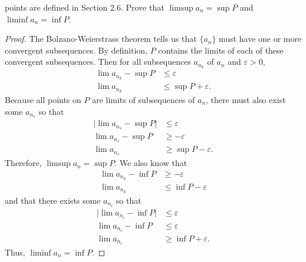 \documentclass{article}
\begin{document}
\begin{enumerate}
            points are defined in Section 2.6. Prove that
            $\limsup a_n=\sup P$ and $\liminf a_n=\inf P$.
            \begin{proof}
                  The Bolzano-Weierstrass theorem tells us that $\{a_n\}$ must
                  have one or more convergent subsequences. By definition, $P$
                  contains the limits of each of these convergent subsequences.
                  Then for all subsequences $a_{n_k}$ of $a_n$ and $\varepsilon>0$,
                  \begin{align*}
                        \lim a_{n_k} - \sup P & \leq \varepsilon           \\
                        \lim a_{n_k}          & \leq \sup P + \varepsilon.
                  \end{align*}
                  Because all points on $P$ are limits of subsequences of $a_n$,
                  there must also exist some $a_{n_s}$ so that
                  \begin{align*}
                        \lvert\lim a_{n_s} - \sup P\rvert & \leq \varepsilon           \\
                        \lim a_{n_s} - \sup P             & \geq -\varepsilon          \\
                        \lim a_{n_s}                      & \geq \sup P - \varepsilon.
                  \end{align*}
                  Therefore, $\limsup a_n=\sup P$.
                  \medbreak
                  We also know that
                  \begin{align*}
                        \lim a_{n_k} - \inf P & \geq -\varepsilon         \\
                        \lim a_{n_k}          & \leq \inf P - \varepsilon
                  \end{align*}
                  and that there exists some $a_{n_i}$ so that
                  \begin{align*}
                        \lvert\lim a_{n_i} - \inf P\rvert & \leq \varepsilon           \\
                        \lim a_{n_i} - \inf P             & \leq \varepsilon           \\
                        \lim a_{n_i}                      & \geq \inf P + \varepsilon.
                  \end{align*}
                  Thus, $\liminf a_n=\inf P$.
            \end{proof}
\end{enumerate}
\end{document}
